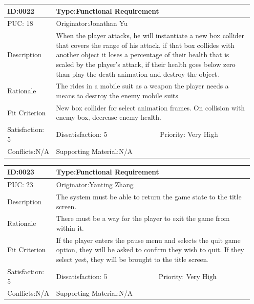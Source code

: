 \documentclass{article}
\begin{document}
	\begin{table}[H]
		\begin{tabular}{|l|l|l|}
			\hline
			ID:0022 & \multicolumn{2}{l|}{Type:Functional Requirement} \\ \hline
			PUC: 18& \multicolumn{2}{l|}{Originator:Jonathan Yu} \\ \hline
			Description & \multicolumn{2}{m{0.85\textwidth}|}{When the player attacks, he will instantiate a new box collider that covers the range of his attack, if that box collides with another object it loses a percentage  of their health that is scaled by the player’s attack, if their health goes below zero than play the death animation and destroy the object.}\\\hline
			Rationale & \multicolumn{2}{m{0.85\textwidth}|}{The rides in a mobile suit as a weapon the player needs a means to destroy the enemy mobile suits} \\ \hline
			Fit Criterion & \multicolumn{2}{m{0.85\textwidth}|}{New box collider for select animation frames. On collision with enemy box, decrease enemy health.} \\ \hline
			Satisfaction: 5 & Dissatisfaction: 5 & Priority: Very High \\ \hline
			Conflicts:N/A & \multicolumn{2}{l|}{Supporting Material:N/A} \\ \hline
		\end{tabular}
	\end{table}


	\begin{table}[H]
		\begin{tabular}{|l|l|l|}
			\hline
			ID:0023 & \multicolumn{2}{l|}{Type:Functional Requirement} \\ \hline
			PUC: 23& \multicolumn{2}{l|}{Originator:Yanting Zhang} \\ \hline
			Description & \multicolumn{2}{m{0.85\textwidth}|}{The system must be able to return the game state to the title screen.}\\\hline
			Rationale & \multicolumn{2}{m{0.85\textwidth}|}{There must be a way for the player to exit the game from within it.} \\ \hline
			Fit Criterion & \multicolumn{2}{m{0.85\textwidth}|}{If the player enters the pause menu and selects the quit game option, they will be asked to confirm they wish to quit. If they select yest, they will be brought to the title screen.} \\ \hline
			Satisfaction: 5 & Dissatisfaction: 5 & Priority: Very High \\ \hline
			Conflicts:N/A & \multicolumn{2}{l|}{Supporting Material:N/A} \\ \hline
		\end{tabular}
	\end{table}
\end{document}
